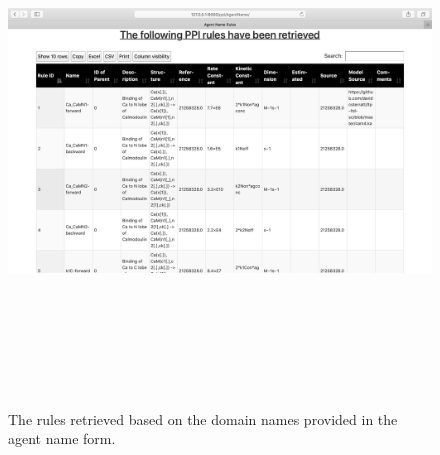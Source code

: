 \documentclass[msc,deptreport,ai]{infthesis}      %
\begin{document}
  \begin{figure}[H]
	\centering
	\captionsetup{justification=centering}
	\includegraphics[width=\linewidth,height=14cm,keepaspectratio]{AgentNameRules.png}	
	\caption{The rules retrieved based on the domain names provided in the agent name form.}
	\label{fig:agentNameRules}		
\end{figure}
\end{document}
